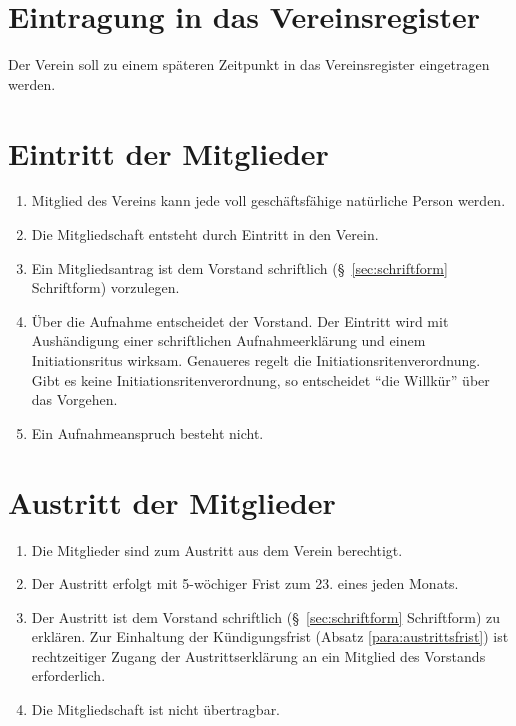 \documentclass[a4paper]{article}
\begin{document}
\section{Eintragung in das Vereinsregister}\label{sec:eintragung_in_das_vereinsregister}

Der Verein soll zu einem späteren Zeitpunkt in das Vereinsregister eingetragen werden.


\section{Eintritt der Mitglieder}\label{sec:eintritt_der_mitglieder}

\begin{enumerate}
\item Mitglied des Vereins kann jede voll geschäftsfähige natürliche Person werden.
\item Die Mitgliedschaft entsteht durch Eintritt in den Verein.
\item Ein Mitgliedsantrag ist dem Vorstand schriftlich (§~\ref{sec:schriftform} Schriftform) vorzulegen.
\item Über die Aufnahme entscheidet der Vorstand. Der Eintritt wird mit Aushändigung einer schriftlichen Aufnahmeerklärung und einem Initiationsritus wirksam. Genaueres regelt die Initiationsritenverordnung. Gibt es keine Initiationsritenverordnung, so entscheidet "`die Willkür"' über das Vorgehen.
\item Ein Aufnahmeanspruch besteht nicht.
\end{enumerate}


\section{Austritt der Mitglieder}\label{sec:austritt_der_mitglieder}

\begin{enumerate}
\item Die Mitglieder sind zum Austritt aus dem Verein berechtigt.
\item Der Austritt erfolgt mit 5-wöchiger Frist zum 23. eines jeden Monats.\label{para:austrittsfrist}
\item Der Austritt ist dem Vorstand schriftlich (§~\ref{sec:schriftform} Schriftform) zu erklären. Zur Einhaltung der Kündigungsfrist (Absatz \ref{para:austrittsfrist}) ist rechtzeitiger Zugang der Austrittserklärung an ein Mitglied des Vorstands erforderlich.
\item Die Mitgliedschaft ist nicht übertragbar.
\end{enumerate}
\end{document}
